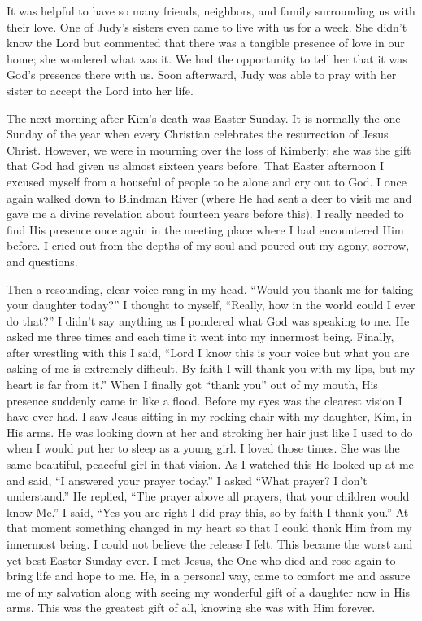 \documentclass[oneside]{book}
\begin{document}
It was helpful to have so many friends, neighbors, and family surrounding us with their love. One of Judy’s sisters even came to live with us for a week. She didn't know the Lord but commented that there was a tangible presence of love in our home; she wondered what was it. We had the opportunity to tell her that it was God’s presence there with us. Soon afterward, Judy was able to pray with her sister to accept the Lord into her life.

The next morning after Kim's death was Easter Sunday. It is normally the one Sunday of the year when every Christian celebrates the resurrection of Jesus Christ. However, we were in mourning over the loss of Kimberly; she was the gift that God had given us almost sixteen years before. That Easter afternoon I excused myself from a houseful of people to be alone and cry out to God. I once again walked down to Blindman River (where He had sent a deer to visit me and gave me a divine revelation about fourteen years before this). I really needed to find His presence once again in the meeting place where I had encountered Him before. I cried out from the depths of my soul and poured out my agony, sorrow, and questions.

Then a resounding, clear voice rang in my head. “Would you thank me for taking your daughter today?” I thought to myself, “Really, how in the world could I ever do that?” I didn't say anything as I pondered what God was speaking to me. He asked me three times and each time it went into my innermost being. Finally, after wrestling with this I said, “Lord I know this is your voice but what you are asking of me is extremely difficult. By faith I will thank you with my lips, but my heart is far from it.” When I finally got “thank you” out of my mouth, His presence suddenly came in like a flood. Before my eyes was the clearest vision I have ever had. I saw Jesus sitting in my rocking chair with my daughter, Kim, in His arms. He was looking down at her and stroking her hair just like I used to do when I would put her to sleep as a young girl. I loved those times. She was the same beautiful, peaceful girl in that vision. As I watched this He looked up at me and said, “I answered your prayer today.” I asked “What prayer? I don't understand.” He replied, “The prayer above all prayers, that your children would know Me.” I said, “Yes you are right I did pray this, so by faith I thank you.” At that moment something changed in my heart so that I could thank Him from my innermost being. I could not believe the release I felt.  This became the worst and yet best Easter Sunday ever. I met Jesus, the One who died and rose again to bring life and hope to me. He, in a personal way, came to comfort me and assure me of my salvation along with seeing my wonderful gift of a daughter now in His arms. This was the greatest gift of all, knowing she was with Him forever.
\end{document}
